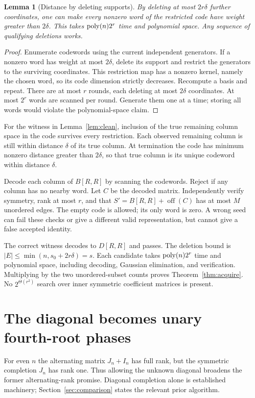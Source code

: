 \documentclass[11pt,a4paper]{article}
\newtheorem{lemma}[theorem]{Lemma}
\theoremstyle{remark}\newtheorem{remark}[theorem]{Remark}
\newcommand{\off}{\operatorname{off}}\newcommand{\col}{\operatorname{col}}
\begin{document}
\begin{lemma}[Distance by deleting supports]\label{lem:prune}
By deleting at most $2r\delta$ further coordinates, one can make
every nonzero word of the restricted code have weight greater
than $2\delta$. This takes $\operatorname{poly}(n)2^r$ time and polynomial
space. Any sequence of qualifying deletions works.
\end{lemma}
\begin{proof}
Enumerate codewords using the current independent generators.
If a nonzero word has weight at most $2\delta$, delete its
support and restrict the generators to the surviving coordinates.
This restriction map has a nonzero kernel, namely the chosen
word, so its code dimension strictly decreases. Recompute a
basis and repeat. There are at most $r$ rounds, each deleting at
most $2\delta$ coordinates. At most $2^r$ words are scanned per
round. Generate them one at a time; storing all words would
violate the polynomial-space claim.
\end{proof}

For the witness in Lemma~\ref{lem:clean}, inclusion of the true
remaining column space in the code survives every restriction.
Each observed remaining column is still within distance $\delta$
of its true column. At termination the code has minimum nonzero
distance greater than $2\delta$, so that true column is its unique
codeword within distance $\delta$.

Decode each column of $B[R,R]$ by scanning the codewords. Reject
if any column has no nearby word. Let $C$ be the decoded matrix.
Independently verify symmetry, rank at most $r$, and that
$S'=B[R,R]+\off(C)$ has at most $M$ unordered edges. The empty
code is allowed; its only word is zero. A wrong seed can fail
these checks or give a different valid representation, but
cannot give a false accepted identity.

The correct witness decodes to $D[R,R]$ and passes. The deletion
bound is $|E|\le\min(n,s_0+2r\delta)=s$.
Each candidate takes $\operatorname{poly}(n)2^r$ time and
polynomial space, including decoding, Gaussian elimination,
and verification. Multiplying by the two unordered-subset counts
proves Theorem~\ref{thm:acquire}. No $2^{\Theta(r^2)}$ search
over inner symmetric coefficient matrices is present.

\section{The diagonal becomes unary fourth-root phases}
\label{sec:refinement}
For even $n$ the alternating matrix $J_n+I_n$ has full rank,
but the symmetric completion $J_n$ has rank one. Thus allowing
the unknown diagonal broadens the former alternating-rank
promise. Diagonal completion alone is established machinery;
Section~\ref{sec:comparison} states the relevant prior algorithm.
\end{document}
